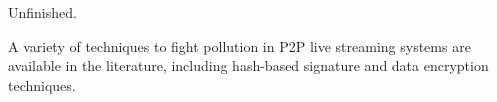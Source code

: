 
\label{sec:CIS}

\begin{notex}
  Unfinished.
\end{notex}

A variety of techniques to fight pollution in P2P live streaming
systems are available in the literature, including hash-based
signature and data encryption techniques.


